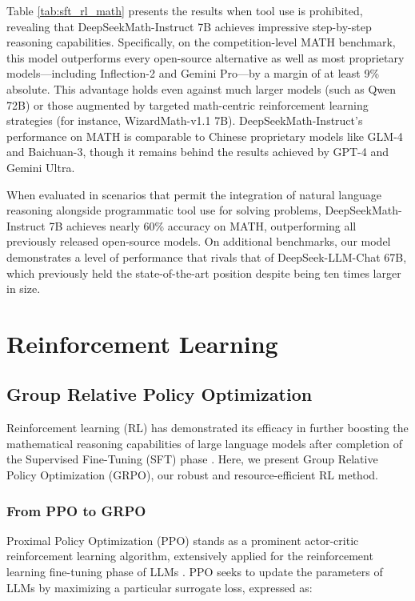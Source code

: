 \begin{itemize}[topsep=0pt]
Table \ref{tab:sft_rl_math} presents the results when tool use is prohibited, revealing that DeepSeekMath-Instruct 7B achieves impressive step-by-step reasoning capabilities. Specifically, on the competition-level MATH benchmark, this model outperforms every open-source alternative as well as most proprietary models—including Inflection-2 and Gemini Pro—by a margin of at least 9\% absolute. This advantage holds even against much larger models (such as Qwen 72B) or those augmented by targeted math-centric reinforcement learning strategies (for instance, WizardMath-v1.1 7B). DeepSeekMath-Instruct’s performance on MATH is comparable to Chinese proprietary models like GLM-4 and Baichuan-3, though it remains behind the results achieved by GPT-4 and Gemini Ultra.

When evaluated in scenarios that permit the integration of natural language reasoning alongside programmatic tool use for solving problems, DeepSeekMath-Instruct 7B achieves nearly 60\% accuracy on MATH, outperforming all previously released open-source models. On additional benchmarks, our model demonstrates a level of performance that rivals that of DeepSeek-LLM-Chat 67B, which previously held the state-of-the-art position despite being ten times larger in size.

\section{Reinforcement Learning}

\subsection{Group Relative Policy Optimization} Reinforcement learning (RL) has demonstrated its efficacy in further boosting the mathematical reasoning capabilities of large language models after completion of the Supervised Fine-Tuning (SFT) phase \citep{wang2023math,wizardmath}. Here, we present Group Relative Policy Optimization (GRPO), our robust and resource-efficient RL method.

\subsubsection{From PPO to GRPO} Proximal Policy Optimization (PPO) \citep{schulman2017proximal} stands as a prominent actor-critic reinforcement learning algorithm, extensively applied for the reinforcement learning fine-tuning phase of LLMs \citep{ouyang2022training}. PPO seeks to update the parameters of LLMs by maximizing a particular surrogate loss, expressed as:


\end{itemize}
